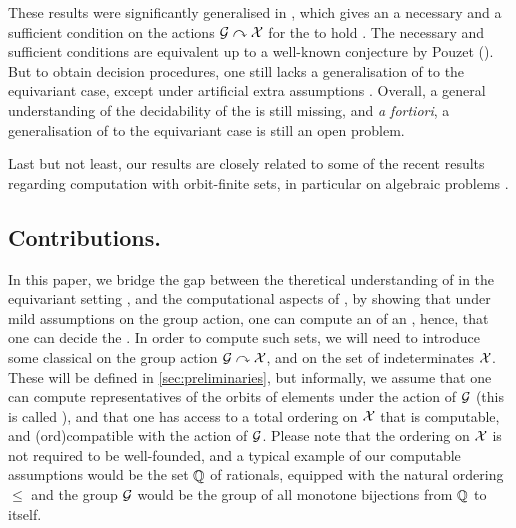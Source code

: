 These results were significantly generalised in \cite{GHOLAS24},
which gives an a necessary and a sufficient condition on the actions $\mathcal{G}\curvearrowright\mathcal{X}$ for the  to hold \cite[Theorems 11 and 12, Lemma 13]{GHOLAS24}.
The necessary and sufficient conditions are equivalent up to a well-known conjecture by Pouzet ().
But to obtain decision procedures,
one still lacks a generalisation of  to the equivariant case, except under artificial extra assumptions \cite[Section 6]{GHOLAS24}.
Overall, a general understanding of the decidability of the  is still missing,
and \emph{a fortiori}, a generalisation of  to the
equivariant case is still an open problem.

Last but not least,
our results are closely related to some of the recent results regarding computation with orbit-finite sets,
in particular on algebraic problems \cite{BFKM24,GHL22,GHL25,KKOT15,Prz23}.


\subsection{Contributions.}
\AP In this paper, we bridge the gap between the
theretical understanding of  in the equivariant
setting \cite{GHOLAS24}, and the computational aspects of , by showing that under mild assumptions on the group action, one can
compute an  of an , hence,
that one can decide the . In order to
compute such sets, we will need to introduce some classical  on the group action $\mathcal{G} \curvearrowright \mathcal{X}$, and on the set of
indeterminates $\mathcal{X}$. These will be defined in
\cref{sec:preliminaries}, but informally, we assume
that one can compute representatives of the orbits of elements under the action
of $\mathcal{G}$ (this is called ), and that one has
access to a total ordering on $\mathcal{X}$ that is computable, and
\kl(ord){compatible} with the action of $\mathcal{G}$. Please note that the ordering
on $\mathcal{X}$ is not required to be well-founded, and a typical example of our
computable assumptions would be the set $\mathbb{Q}$ of rationals, equipped with the
natural ordering $\leq$ and the group $\mathcal{G}$ would be the group of all
monotone bijections from $\mathbb{Q}$ to itself.


